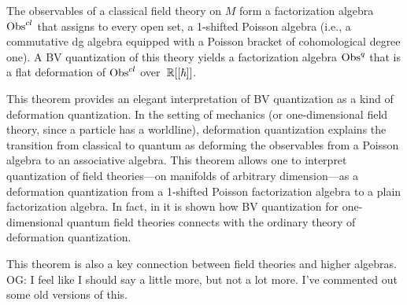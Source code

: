\documentclass[11pt]{amsart}
\def\owen#1{{\textcolor{violet!65!black}{OG: {#1}}}}
\begin{document}
\begin{thm}
\label{main}
The observables of a classical field theory on $M$ form a factorization algebra ${\rm Obs}^{cl}$ that assigns to every open set, a 1-shifted Poisson algebra (i.e., a commutative dg algebra equipped with a Poisson bracket of cohomological degree one). A BV quantization of this theory yields a factorization algebra ${\rm Obs}^q$ that is a flat deformation of ${\rm Obs}^{cl}$ over~$\mathbb R[[\hbar]]$.
\end{thm}

This theorem provides an elegant interpretation of BV quantization as a kind of deformation quantization. 
In the setting of mechanics (or one-dimensional field theory, since a particle has a worldline), deformation quantization explains the transition from classical to quantum as deforming the observables from a Poisson algebra to an associative algebra. 
This theorem allows one to interpret quantization of field theories---on manifolds of arbitrary dimension---as a deformation quantization from a 1-shifted Poisson factorization algebra to a plain factorization algebra. 
In fact, in \cite{GLL,Si Kai and Zhengping} it is shown how BV quantization for one-dimensional quantum field theories connects with the ordinary theory of deformation quantization. 

This theorem is also a key connection between field theories and higher algebras.
\owen{I feel like I should say a little more, but not a lot more. I've commented out some old versions of this.}
\end{document}
